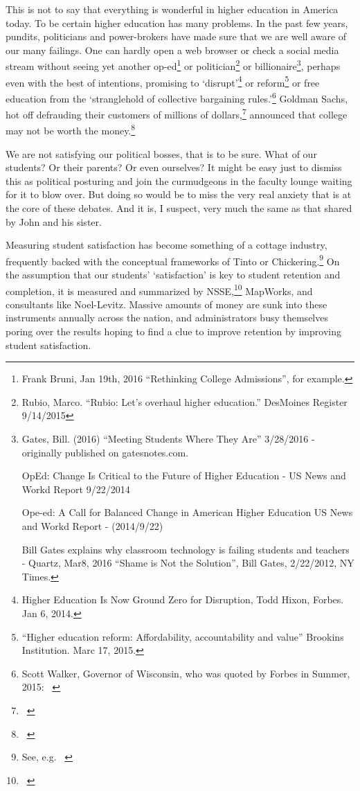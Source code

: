 This is not to say that everything is wonderful in higher education in America today. To be certain higher education has many problems. In the past few years, pundits, politicians and power-brokers have made sure that we are well aware of our many failings. One can hardly open a web browser or check a social media stream without seeing yet another op-ed\footnote{Frank Bruni, Jan 19th, 2016 ``Rethinking College Admissions'', for example.} or politician\footnote{Rubio, Marco. ``Rubio: Let's overhaul higher education.'' DesMoines Register 9\slash 14\slash 2015} or billionaire\footnote{Gates, Bill. (2016) ``Meeting Students Where They Are'' 3\slash 28\slash 2016 - originally published on gatesnotes.com.

OpEd: Change Is Critical to the Future of Higher Education - US News and Workd Report 9\slash 22\slash 2014

Ope-ed: A Call for Balanced Change in American Higher Education US News and Workd Report - (2014\slash 9\slash 22)

Bill Gates explains why classroom technology is failing students and teachers - Quartz, Mar8, 2016 ``Shame is Not the Solution'', Bill Gates, 2\slash 22\slash 2012, NY Times.}, perhaps even with the best of intentions, promising to `disrupt'\footnote{Higher Education Is Now Ground Zero for Disruption, Todd Hixon, Forbes. Jan 6, 2014.} or reform\footnote{``Higher education reform: Affordability, accountability and value'' Brookins Institution. Marc 17, 2015.} or free education from the `stranglehold of collective bargaining rules.'\footnote{Scott Walker, Governor of Wisconsin, who was quoted by Forbes in Summer, 2015: ~\citep{Sullivan:2015uc}} Goldman Sachs, hot off defrauding their customers of millions of dollars,\footnote{~\citep{Armstrong:vv}} announced that college may not be worth the money.\footnote{~\citep{Metz:2015uq}} 

We are not satisfying our political bosses, that is to be sure. What of our students? Or their parents? Or even ourselves? It might be easy just to dismiss this as political posturing and join the curmudgeons in the faculty lounge waiting for it to blow over. But doing so would be to miss the very real anxiety that is at the core of these debates. And it is, I suspect, very much the same as that shared by John and his sister.

Measuring student satisfaction has become something of a cottage industry, frequently backed with the conceptual frameworks of Tinto or Chickering.\footnote{See, e.g. ~\citep{Billiips:2008wa}} On the assumption that our students' `satisfaction' is key to student retention and completion, it is measured and summarized by NSSE,\footnote{~\citep{Anonymous:2016uk}} MapWorks, and consultants like Noel-Levitz. Massive amounts of money are sunk into these instruments annually across the nation, and administrators busy themselves poring over the results hoping to find a clue to improve retention by improving student satisfaction. 

